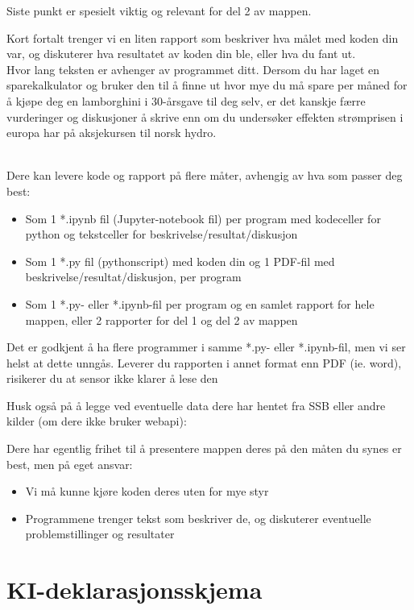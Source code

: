 \documentclass[12pt, titlepage]{article}
\begin{document}
Siste punkt er spesielt viktig og relevant for del 2 av mappen.

Kort fortalt trenger vi en liten rapport som beskriver hva målet med koden din var, og diskuterer hva resultatet av koden din ble, eller hva du fant ut.\\
Hvor lang teksten er avhenger av programmet ditt. 
Dersom du har laget en sparekalkulator og bruker den til å finne ut hvor mye du må spare per måned for å kjøpe deg en lamborghini i 30-årsgave til deg selv, er det kanskje færre vurderinger og diskusjoner å skrive enn om du undersøker effekten strømprisen i europa har på aksjekursen til norsk hydro.

~\\
Dere kan  levere kode og rapport på flere måter, avhengig av hva som passer deg best:
\begin{itemize}
   \item {Som 1 *.ipynb fil (Jupyter-notebook fil) per program med kodeceller for python og tekstceller for beskrivelse/resultat/diskusjon}
   \item {Som 1 *.py fil (pythonscript) med koden din og 1 PDF-fil med beskrivelse/resultat/diskusjon, per program}
   \item {Som 1 *.py- eller *.ipynb-fil per program og en samlet rapport for hele mappen, eller 2 rapporter for del 1 og del 2 av mappen}
\end{itemize}

Det er godkjent å ha flere programmer i samme *.py- eller *.ipynb-fil, men vi ser helst at dette unngås.
Leverer du rapporten i annet format enn PDF (ie. word), risikerer du at sensor ikke klarer å lese den 

Husk også på å legge ved eventuelle data dere har hentet fra SSB eller andre kilder (om dere ikke bruker webapi):

Dere har egentlig frihet til å presentere mappen deres på den måten du synes er best, men på eget ansvar:
\begin{itemize}
   \item {Vi må kunne kjøre koden deres uten for mye styr}
   \item {Programmene trenger tekst som beskriver de, og diskuterer eventuelle problemstillinger og resultater}
\end{itemize}

\section*{KI-deklarasjonsskjema}
\end{document}
